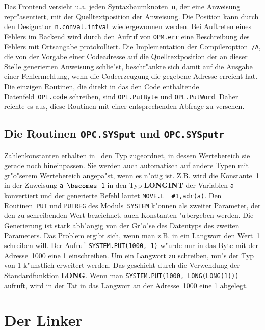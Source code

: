 Das Frontend versieht u.a. jeden Syntaxbaumknoten~{\tt n}, der eine Anweisung
repr"asentiert, mit der Quelltextposition der Anweisung.
Die Position kann durch den Designator~{\tt n\caret.conval\caret.intval}
wiedergewonnen werden.
Bei Auftreten eines Fehlers im Backend wird durch den Aufruf von {\tt OPM.err}
eine Beschreibung des Fehlers mit Ortsangabe protokolliert.
Die Implementation der Compileroption~{\tt /A}, die von der Vorgabe einer
Codeadresse auf die Quelltextposition der an dieser Stelle generierten
Anweisung schlie"st, beschr"ankte sich damit auf die Ausgabe einer Fehlermeldung,
wenn die Codeerzeugung die gegebene Adresse erreicht hat.
Die einzigen Routinen, die direkt in das den Code enthaltende Datenfeld~{\tt OPL.code}
schreiben, sind {\tt OPL.PutByte} und {\tt OPL.PutWord}.
Daher reichte es aus, diese Routinen mit einer entsprechenden Abfrage zu
versehen.


\subsection{Die Routinen {\tt OPC.SYSput} und {\tt OPC.SYSputr}}

Zahlenkonstanten erhalten in \oberon\ den Typ zugeordnet, in dessen
Wertebereich sie gerade noch hineinpassen.
Sie werden auch automatisch auf andere Typen mit gr"o"serem Wertebereich
angepa"st, wenn es n"otig ist.
Z.B. wird die Konstante~1 in der Zuweisung {\tt a $\becomes$ 1} in den
Typ {\bf LONGINT} der Variablen {\tt a} konvertiert und der generierte
Befehl lautet {\tt MOVE.L\ \ \#1,adr(a)}.
Den Routinen~{\tt PUT} und {\tt PUTREG} des Moduls~{\tt SYSTEM}
k"onnen als zweiter Parameter, der den zu schreibenden Wert bezeichnet,
auch Konstanten "ubergeben werden.
Die Generierung ist stark abh"angig von der Gr"o"se des Datentyps des
zweiten Parameters.
Das Problem ergibt sich, wenn man z.B. in ein Langwort den Wert~1 schreiben
will.
Der Aufruf~{\tt SYSTEM.PUT(1000, 1)} w"urde nur in das Byte mit
der Adresse~1000 eine 1 einschreiben.
Um ein Langwort zu schreiben, mu"s der Typ von 1 k"unstlich erweitert werden.
Das geschieht durch die Verwendung der Standardfunktion {\bf LONG}.
Wenn man {\tt SYSTEM.PUT(1000, LONG(LONG(1)))} aufruft, wird in der Tat
in das Langwort an der Adresse~1000 eine 1 abgelegt.


\section{Der Linker}

